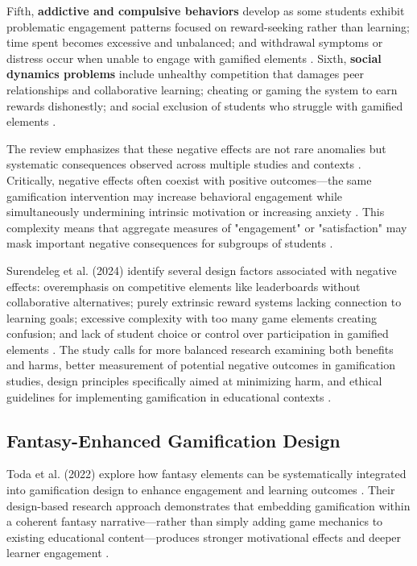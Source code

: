 \documentclass[12pt,a4paper]{article}
\begin{document}
Fifth, \textbf{addictive and compulsive behaviors} develop as some students exhibit problematic engagement patterns focused on reward-seeking rather than learning; time spent becomes excessive and unbalanced; and withdrawal symptoms or distress occur when unable to engage with gamified elements \parencite{surendeleg2024}. Sixth, \textbf{social dynamics problems} include unhealthy competition that damages peer relationships and collaborative learning; cheating or gaming the system to earn rewards dishonestly; and social exclusion of students who struggle with gamified elements \parencite{surendeleg2024}.

The review emphasizes that these negative effects are not rare anomalies but systematic consequences observed across multiple studies and contexts \parencite{surendeleg2024}. Critically, negative effects often coexist with positive outcomes—the same gamification intervention may increase behavioral engagement while simultaneously undermining intrinsic motivation or increasing anxiety \parencite{surendeleg2024}. This complexity means that aggregate measures of "engagement" or "satisfaction" may mask important negative consequences for subgroups of students \parencite{surendeleg2024}.

Surendeleg et al. (2024) identify several design factors associated with negative effects: overemphasis on competitive elements like leaderboards without collaborative alternatives; purely extrinsic reward systems lacking connection to learning goals; excessive complexity with too many game elements creating confusion; and lack of student choice or control over participation in gamified elements \parencite{surendeleg2024}. The study calls for more balanced research examining both benefits and harms, better measurement of potential negative outcomes in gamification studies, design principles specifically aimed at minimizing harm, and ethical guidelines for implementing gamification in educational contexts \parencite{surendeleg2024}.


\subsection{Fantasy-Enhanced Gamification Design}

Toda et al. (2022) explore how fantasy elements can be systematically integrated into gamification design to enhance engagement and learning outcomes \parencite{toda2022,bai2022incorporating}. Their design-based research approach demonstrates that embedding gamification within a coherent fantasy narrative—rather than simply adding game mechanics to existing educational content—produces stronger motivational effects and deeper learner engagement \parencite{toda2022}.
\end{document}
